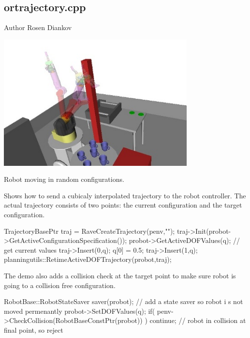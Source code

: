 \hypertarget{ortrajectory.cpp-example}{
\subsection{ortrajectory.cpp}
}
\begin{DoxyAuthor}{Author}
Rosen Diankov
\end{DoxyAuthor}
 
\begin{DoxyImage}
\includegraphics[width=10cm]{cppexample_ortrajectory.jpg}
\caption{Robot moving in random configurations.}
\end{DoxyImage}


Shows how to send a cubicaly interpolated trajectory to the robot controller. The actual trajectory consists of two points: the current configuration and the target configuration.


\begin{DoxyCode}
    TrajectoryBasePtr traj = RaveCreateTrajectory(penv,"");
    traj->Init(probot->GetActiveConfigurationSpecification());
    probot->GetActiveDOFValues(q); // get current values
    traj->Insert(0,q);
    q[0] = 0.5;
    traj->Insert(1,q);
    planningutils::RetimeActiveDOFTrajectory(probot,traj);
\end{DoxyCode}


The demo also adds a collision check at the target point to make sure robot is going to a collision free configuration.


\begin{DoxyCode}
    {
        RobotBase::RobotStateSaver saver(probot); // add a state saver so robot i
      s not moved permenantly
        probot->SetDOFValues(q);
        if( penv->CheckCollision(RobotBaseConstPtr(probot)) ) {
            continue; // robot in collision at final point, so reject
        }
    }
\end{DoxyCode}


